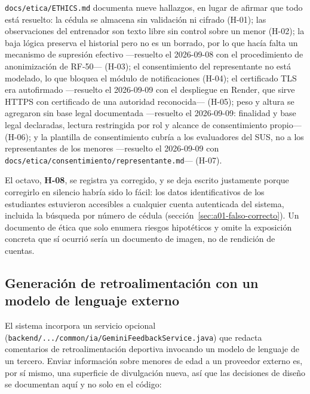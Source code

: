\documentclass[11pt,a4paper]{article}
\newcommand{\ruta}[1]{\texttt{\footnotesize #1}}
\begin{document}
\ruta{docs/etica/ETHICS.md} documenta nueve hallazgos, en lugar de afirmar
que todo está resuelto: la cédula se almacena sin validación ni cifrado
(H-01); las observaciones del entrenador son texto libre sin control sobre
un menor (H-02); la baja lógica preserva el historial pero no es un borrado,
por lo que hacía falta un mecanismo de supresión efectivo —resuelto el
2026-09-08 con el procedimiento de anonimización de RF-50— (H-03); el consentimiento del
representante no está modelado, lo que bloquea el módulo de notificaciones
(H-04); el certificado TLS era autofirmado —resuelto el 2026-09-09 con el
despliegue en Render, que sirve HTTPS con certificado de una autoridad
reconocida— (H-05); peso y altura se agregaron sin base legal
documentada —resuelto el 2026-09-09: finalidad y base legal declaradas,
lectura restringida por rol y alcance de consentimiento propio— (H-06); y la
plantilla de consentimiento cubría a los evaluadores del SUS, no a los
representantes de los menores —resuelto el 2026-09-09 con
\ruta{docs/etica/consentimiento/representante.md}— (H-07).

El octavo, \textbf{H-08}, se registra ya corregido, y se deja escrito
justamente porque corregirlo en silencio habría sido lo fácil: los datos
identificativos de los estudiantes estuvieron accesibles a cualquier cuenta
autenticada del sistema, incluida la búsqueda por número de cédula
(sección~\ref{sec:a01-falso-correcto}). Un documento de ética que solo
enumera riesgos hipotéticos y omite la exposición concreta que sí ocurrió
sería un documento de imagen, no de rendición de cuentas.

\subsection{Generación de retroalimentación con un modelo de lenguaje externo}
\label{sec:ia-feedback}

El sistema incorpora un servicio opcional
(\ruta{backend/.../common/ia/GeminiFeedbackService.java}) que redacta
comentarios de retroalimentación deportiva invocando un modelo de lenguaje
de un tercero. Enviar información sobre menores de edad a un proveedor
externo es, por sí mismo, una superficie de divulgación nueva, así que las
decisiones de diseño se documentan aquí y no solo en el código:
\end{document}
